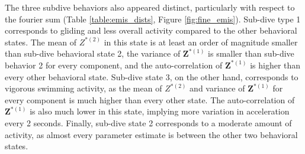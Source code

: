 The three subdive behaviors also appeared distinct, particularly with respect to the fourier sum (Table \ref{table:emis_dists},  Figure  \ref{fig:fine_emis}). Sub-dive type 1 corresponds to gliding and less overall activity compared to the other behavioral states. The mean of $Z^{*(2)}$ in this state is at least an order of magnitude smaller than sub-dive behavioral state 2, the variance of $\mathbf{Z}^{*(1)}$ is smaller than sub-dive behavior 2 for every component, and the auto-correlation of $\mathbf{Z}^{*(1)}$ is higher than every other behavioral state. Sub-dive state 3, on the other hand, corresponds to vigorous swimming activity, as the mean of $Z^{*(2)}$ and variance of $\mathbf{Z}^{*(1)}$ for every component is much higher than every other state. The auto-correlation of $\mathbf{Z}^{*(1)}$ is also much lower in this state, implying more variation in acceleration every 2 seconds. Finally, sub-dive state 2 corresponds to a moderate amount of activity, as almost every parameter estimate is between the other two behavioral states.

